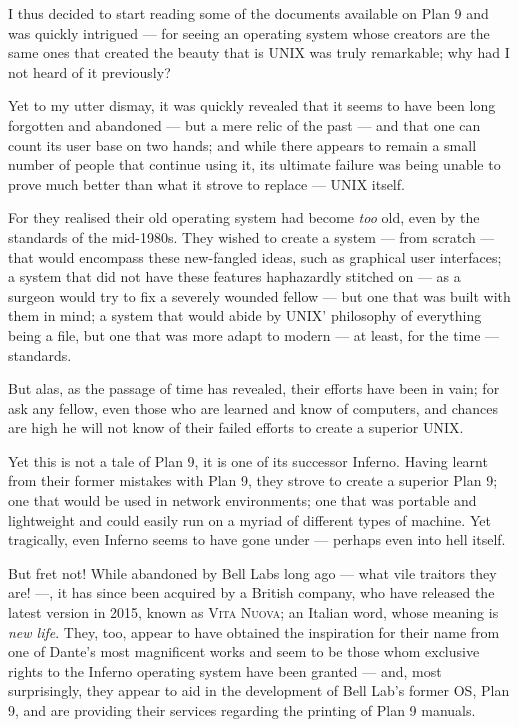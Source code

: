 \documentclass[a5paper,twoside,12pt]{report}
\begin{document}
I thus decided to start reading some of the documents available on Plan 9 and was quickly intrigued — for seeing an operating system whose creators are the same ones that created the beauty that is UNIX was truly remarkable; why had I not heard of it previously?

Yet to my utter dismay, it was quickly revealed that it seems to have been long forgotten and abandoned — but a mere relic of the past — and that one can count its user base on two hands; and while there appears to remain a small number of people that continue using it, its ultimate failure was being unable to prove much better than what it strove to replace — UNIX itself.

For they realised their old operating system had become \textit{too} old, even by the standards of the mid-1980s. They wished to create a system — from scratch — that would encompass these new-fangled ideas, such as graphical user interfaces; a system that did not have these features haphazardly stitched on — as a surgeon would try to fix a severely wounded fellow — but one that was built with them in mind; a system that would abide by UNIX' philosophy of everything being a file, but one that was more adapt to modern — at least, for the time — standards.

But alas, as the passage of time has revealed, their efforts have been in vain; for ask any fellow, even those who are learned and know of computers, and chances are high he will not know of their failed efforts to create a superior UNIX.

Yet this is not a tale of Plan 9, it is one of its successor Inferno. Having learnt from their former mistakes with Plan 9, they strove to create a superior Plan 9; one that would be used in network environments; one that was portable and lightweight and could easily run on a myriad of different types of machine.
Yet tragically, even Inferno seems to have gone under — perhaps even into hell itself.

But fret not! While abandoned by Bell Labs long ago — what vile traitors they are! —, it has since been acquired by a British company, who have released the latest version in 2015, known as \textsc{Vita Nuova}; an Italian word, whose meaning is \textit{new life}. They, too, appear to have obtained the inspiration for their name from one of Dante's most magnificent works and seem to be those whom exclusive rights to the Inferno operating system have been granted — and, most surprisingly, they appear to aid in the development of Bell Lab's former OS, Plan 9, and are providing their services regarding the printing of Plan 9 manuals.
\end{document}
